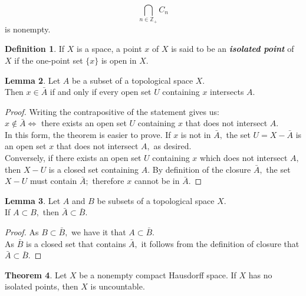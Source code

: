 \documentclass{article}
\theoremstyle{definition}
\newtheorem{theorem}{Theorem}[section]
\newtheorem{lem}[theorem]{Lemma}
\newtheorem{defn}[theorem]{Definition}
\begin{document}
\[\bigcap_{n\in\mathbb{Z}_+}C_n\]
is nonempty.
%
\begin{defn}
  If $X$ is a space, a point $x$ of $X$ is said to be an \textbf{\emph{isolated point}} of $X$ if the one-point set $\{x\}$ is open in $X.$
\end{defn}
\begin{lem}\label{lem:closure intersection}
  Let $A$ be a subset of a topological space $X.$\\
  Then $x \in \bar{A}$ if and only if every open set $U$ containing $x$ intersects $A.$
\end{lem}
\begin{proof}
  Writing the contrapositive of the statement gives us:\\
  $x \not\in \bar{A} \iff$ there exists an open set $U$ containing $x$ that does not intersect $A.$\\
  In this form, the theorem is easier to prove. If $x$ is not in $\bar{A},$ the set $U = X - \bar{A}$ is an open set $x$ that does not intersect $A,$ as desired. \\Conversely, if there exists an open set $U$ containing $x$ which does not intersect $A,$ then $X - U$ is a closed set containing $A.$ By definition of the closure $\bar{A},$ the set $X - U$ must contain $\bar{A};$ therefore $x$ cannot be in $\bar{A}.$
\end{proof}
\begin{lem}
  Let $A$ and $B$ be subsets of a topological space $X.$\\
  If $A \subset B,$ then $\bar{A} \subset \bar{B}.$
\end{lem}
\begin{proof}
  As $B \subset \bar{B},$ we have it that $A \subset \bar{B}.$\\
  As $\bar{B}$ is a closed set that contains $\bar{A},$ it follows from the definition of closure that $\bar{A} \subset \bar{B}.$
\end{proof}
\begin{theorem}
  Let $X$ be a nonempty compact Hausdorff space. If $X$ has no isolated points, then $X$ is uncountable.
\end{theorem}
\end{document}
